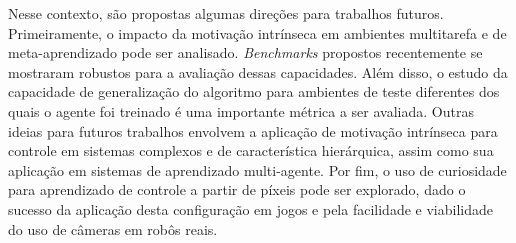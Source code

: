 Nesse contexto, são propostas algumas direções para trabalhos futuros. Primeiramente, o impacto da motivação intrínseca em ambientes multitarefa e de meta-aprendizado pode ser analisado. \textit{Benchmarks} propostos recentemente \cite{metaworld} se mostraram robustos para a avaliação dessas capacidades. Além disso, o estudo da capacidade de generalização do algoritmo para ambientes de teste diferentes dos quais o agente foi treinado é uma importante métrica a ser avaliada. Outras ideias para futuros trabalhos envolvem a aplicação de motivação intrínseca para controle em sistemas complexos e de característica hierárquica, assim como sua aplicação em sistemas de aprendizado multi-agente. Por fim, o uso de curiosidade para aprendizado de controle a partir de píxeis pode ser explorado, dado o sucesso da aplicação desta configuração em jogos \cite{curiositylarge} e pela facilidade e viabilidade do uso de câmeras em robôs reais.